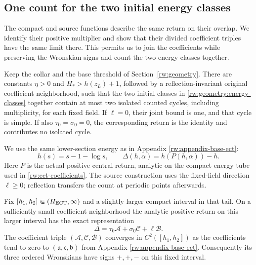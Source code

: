 \subsection{One count for the two initial energy classes}

The compact and source functions describe the same return on their
overlap. We identify their positive multiplier and show that their
divided coefficient triples have the same limit there. This permits
us to join the coefficients while preserving the Wronskian signs and
count the two energy classes together.

\begin{proposition}
\label{rw:initial-joint-bound}
Keep the collar and the base threshold of Section~\ref{rw:geometry}.
There are constants $\eta>0$ and $H_*>h(z_L)+1$, followed by a
reflection-invariant original coefficient neighborhood, such that the
two initial classes in \eqref{rw:geometry:energy-classes} together
contain at most two isolated counted cycles, including multiplicity,
for each fixed field. If $\ell=0$, their joint bound is one, and
that cycle is simple. If also $\tau_0=\sigma_0=0$, the corresponding
return is the identity and contributes no isolated cycle.
\end{proposition}

We use the same lower-section energy as in Appendix
\ref{rw:appendix-base-ect}:
\[
 h(s)=s-1-\log s,\qquad
 \Delta(h,\alpha)=h(P(h,\alpha))-h.
\]
Here $P$ is the actual positive central return, analytic on the compact
energy tube used in \eqref{rw:ect-coefficients}. The source construction
uses the fixed-field direction $\ell\ge0$; reflection transfers the
count at periodic points afterwards.

\begin{lemma}
\label{rw:source:compact-division}
Fix $[h_1,h_2]\Subset(H_{\rm ECT},\infty)$ and a slightly larger
compact interval in that tail. On a sufficiently small coefficient
neighborhood the analytic positive return on this larger interval has
the exact representation
\begin{equation}\label{rw:source:compact-columns}
 \Delta=\tau_0\mathcal A+\sigma_0\mathcal C+\ell\mathcal B.
\end{equation}
The coefficient triple $(\mathcal A,\mathcal C,\mathcal B)$
converges in $C^2([h_1,h_2])$ as the coefficients tend to zero to
$(\mathfrak a,\mathfrak c,\mathfrak b)$ from Appendix
\ref{rw:appendix-base-ect}. Consequently its three ordered Wronskians
have signs $+,+,-$ on this fixed interval.
\end{lemma}

